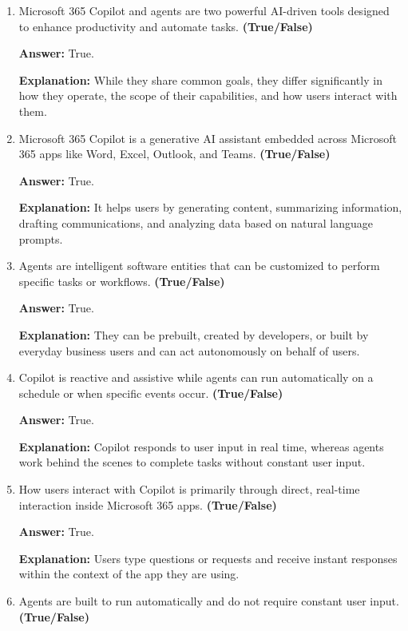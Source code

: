 \documentclass[10pt]{article}
\begin{document}
\begin{enumerate}[leftmargin=*]

\item Microsoft 365 Copilot and agents are two powerful AI-driven tools designed to enhance productivity and automate tasks. \textbf{(True/False)}

\textbf{Answer:} True.

\textbf{Explanation:} While they share common goals, they differ significantly in how they operate, the scope of their capabilities, and how users interact with them.

\item Microsoft 365 Copilot is a generative AI assistant embedded across Microsoft 365 apps like Word, Excel, Outlook, and Teams. \textbf{(True/False)}

\textbf{Answer:} True.

\textbf{Explanation:} It helps users by generating content, summarizing information, drafting communications, and analyzing data based on natural language prompts.

\item Agents are intelligent software entities that can be customized to perform specific tasks or workflows. \textbf{(True/False)}

\textbf{Answer:} True.

\textbf{Explanation:} They can be prebuilt, created by developers, or built by everyday business users and can act autonomously on behalf of users.

\item Copilot is reactive and assistive while agents can run automatically on a schedule or when specific events occur. \textbf{(True/False)}

\textbf{Answer:} True.

\textbf{Explanation:} Copilot responds to user input in real time, whereas agents work behind the scenes to complete tasks without constant user input.

\item How users interact with Copilot is primarily through direct, real-time interaction inside Microsoft 365 apps. \textbf{(True/False)}

\textbf{Answer:} True.

\textbf{Explanation:} Users type questions or requests and receive instant responses within the context of the app they are using.

\item Agents are built to run automatically and do not require constant user input. \textbf{(True/False)}


\end{enumerate}
\end{document}
